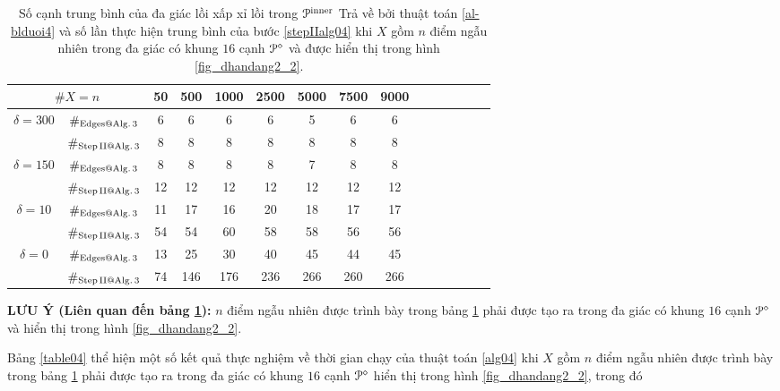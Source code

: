 \documentclass[12pt,a4paper,openany,oneside]{report}
\begin{document}
\begin{table}[ht]
	\begin{center}\renewcommand{\arraystretch}{1.2}\small
		\setlength\tabcolsep{0.05cm}
		\begin{tabular}{|c|c||c|c|c|c|c|c|c|c|c|c|c|c|c|}
			\hline
			\multicolumn {2}{|c||}{\footnotesize $\#X=n$}  &50& 500& 1000& 2500& 5000& 7500& 9000\\ 
			\hline		
			\hline
			{ $\delta = 300$}
			
			& $\#_{\rm Edges@ Alg.\, 3}$  &6&6&6&6&5&6&6\\
			
			& $\#_{\rm Step\, II @ Alg.\, 3}$&8&8&8&8&8&8&8   \\
			\hline
			{ $\delta = 150$}
			
			& $\#_{\rm Edges@ Alg.\, 3}$  &8&8&8&8&7&8&8 \\
			
			& $\#_{\rm Step\, II @ Alg.\, 3}$&12&12&12&12&12&12&12\\
			\hline
			{ $\delta = 10$}
			
			& $\#_{\rm Edges@ Alg.\,3}$  &11&17&16&20&18&17&17 \\
			
			& $\#_{\rm Step\, II @ Alg.\, 3}$&54&54&60&58&58&56&56  \\
			\hline
			{ $\delta = 0$}
			
			& $\#_{\rm Edges@ Alg.\, 3}$  &13&25&30&40&45&44&45 \\
			
			& $\#_{\rm Step\, II @ Alg.\, 3}$&74&146&176&236&266&260&266   \\
			\hline
		\end{tabular}
		\caption{Số cạnh trung bình của đa giác lồi xấp xỉ lồi trong ${\cal P}^{\rm inner}$ Trả về bởi thuật toán \ref{al-blduoi4} và số lần thực hiện trung bình của bước \ref{stepIIalg04} khi $X$ gồm $n$ điểm ngẫu nhiên trong đa giác có khung $16$ cạnh ${\cal P}^\diamond$ và được hiển thị trong hình \ref{fig_dhandang2_2}.}
		\label{table03}
	\end{center}
\end{table} 	

	\bigskip\noindent
	{\bf LƯU Ý (Liên quan đến bảng \ref{table03}):}  $n$ điểm ngẫu nhiên được trình bày trong bảng \ref{table03} phải được tạo ra trong đa giác có khung $16$ cạnh ${\cal P}^\diamond$ và hiển thị trong hình \ref{fig_dhandang2_2}.
	
	\bigskip

\medskip
Bảng \ref{table04}  thể hiện một số kết quả thực nghiệm về thời gian chạy của thuật toán  \ref{alg04} khi $X$ gồm $n$ điểm ngẫu nhiên được trình bày trong bảng \ref{table03} phải được tạo ra trong đa giác có khung $16$ cạnh ${\cal P}^\diamond$ hiển thị trong hình \ref{fig_dhandang2_2}, trong đó
\end{document}
